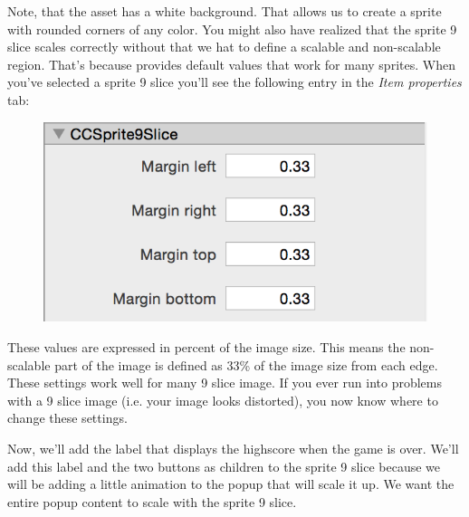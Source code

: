 Note, that the asset  has a white background.
That allows us to create a sprite with rounded corners of any color. You might
also have realized that the sprite 9 slice scales correctly without that we hat
to define a scalable and non-scalable region. That's because \SB{} provides
default values that work for many sprites. When you've selected a sprite 9 slice
you'll see the following entry in the \textit{Item properties} tab:
\begin{figure}[H]
    \centering
    \includegraphics[width=0.5\linewidth]{images/Chapter7/9_slice_settings.png}
\end{figure}
These values are expressed in percent of the image size. This means the
non-scalable part of the image is defined as 33\% of the image size from
each edge.
These settings work well for many 9 slice image. If you ever run into problems
 with a 9 slice image (i.e. your image looks distorted), you now know where to
change these settings.

Now, we'll add the label that displays the highscore when the game is over.
We'll add this label and the two buttons as children to the sprite 9 slice
because we will be adding a little animation to the popup that will scale it up.
We want the entire popup content to scale with the sprite 9 slice.

